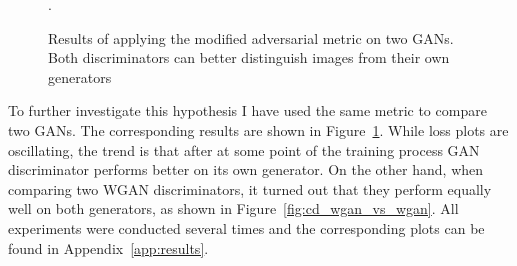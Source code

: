 \begin{figure}[h]
\begin{subfigure}[b]{0.5\textwidth}
	\end{subfigure}
	\caption{Results of applying the modified adversarial metric on two GANs. Both discriminators can better distinguish images from their own generators}.
	\label{fig:cd_gan_vs_gan}
\end{figure}

To further investigate this hypothesis I have used the same metric to compare two GANs. The corresponding results are shown in Figure~\ref{fig:cd_gan_vs_gan}. While loss plots are oscillating, the trend is that after at some point of the training process GAN discriminator performs better on its own generator. On the other hand, when comparing two WGAN discriminators, it turned out that they perform equally well on both generators, as shown in Figure~\ref{fig:cd_wgan_vs_wgan}. All experiments were conducted several times and the corresponding plots can be found in Appendix~\ref{app:results}.
